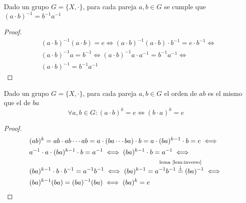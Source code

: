 \begin{lem}
    Dado un grupo $G = \{X, \cdot\}$, para cada pareja $a,b \in G$ se cumple que $(a\cdot b)^{-1}=b^{-1}a^{-1}$
    \label{lem:inverso}
\end{lem}

\begin{proof}
    \begin{equation}
        \begin{split}
            & (a \cdot b)^{-1} (a \cdot b) = e \iff (a\cdot b)^{-1}(a\cdot b)\cdot b^{-1} = e \cdot b^{-1} \iff\\
            & (a\cdot b)^{-1}a = b^{-1} \iff (a\cdot b)^{-1}a\cdot a^{-1} = b^{-1}a^{-1} \iff\\
            & (a\cdot b)^{-1} = b^{-1} a^{-1}
        \end{split}
    \end{equation}
\end{proof}

\begin{thm}
    Dado un grupo $G = \{X, \cdot\}$, para cada pareja $a,b \in G$ el orden de $ab$ es el mismo que el de $ba$
    \begin{equation}
        \forall a,b \in G: (a\cdot b)^{k} = e \iff (b \cdot a)^{k} = e  
    \end{equation}
\end{thm}

\begin{proof}
    \begin{equation}
        \begin{split}
        & (ab)^{k} = ab\cdot ab\cdots ab = a \cdot (ba \cdots ba) \cdot b = a \cdot (ba)^{k-1} \cdot b = e \iff\\
        & a^{-1}\cdot a\cdot (ba)^{k-1}\cdot b = a^{-1} \iff (ba)^{k-1}\cdot b = a^{-1} \iff\\
        & (ba)^{k-1}\cdot b \cdot b^{-1}  = a^{-1}b^{-1} \iff (ba)^{k-1} = a^{-1}b^{-1} \annoterel{\text{lema} \ref{lem:inverso}}{=} (ba)^{-1} \iff\\
        & (ba)^{k-1}(ba) = (ba)^{-1}(ba) \iff (ba)^{k} = e   
        \end{split}
    \end{equation}
\end{proof}
